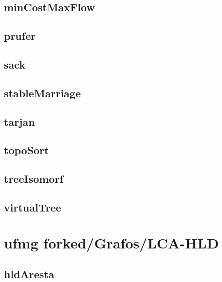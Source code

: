 \subsection{minCostMaxFlow}
\raggedbottom
\hrulefill
\subsection{prufer}
\raggedbottom
\hrulefill
\subsection{sack}
\raggedbottom
\hrulefill
\subsection{stableMarriage}
\raggedbottom
\hrulefill
\subsection{tarjan}
\raggedbottom
\hrulefill
\subsection{topoSort}
\raggedbottom
\hrulefill
\subsection{treeIsomorf}
\raggedbottom
\hrulefill
\subsection{virtualTree}
\raggedbottom
\hrulefill

\section{ufmg forked/Grafos/LCA-HLD}
\subsection{hldAresta}
\raggedbottom
\hrulefill
